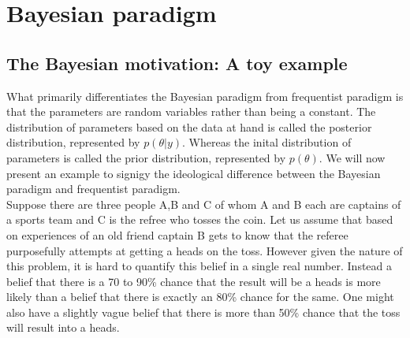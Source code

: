 
\chapter{Bayesian paradigm}
\label{ch : bayesian_paradigm}

\section{The Bayesian motivation: A toy example}
What primarily differentiates the Bayesian paradigm from frequentist paradigm is that the parameters are random variables rather than being a constant. The distribution of parameters based on the data at hand is called the posterior distribution, represented by $p(\theta|y)$. Whereas the inital distribution of parameters is called the prior distribution, represented by $p(\theta)$. We will now present an example to signigy the ideological difference between the Bayesian paradigm and frequentist paradigm.\\

Suppose there are three people A,B and C of whom A and B each are captains of a sports team and C is the refree who tosses the coin. Let us assume that based on experiences of an old friend captain B gets to know that the referee purposefully attempts at getting a heads on the toss. However given the nature of this problem, it is hard to quantify this belief in a single real number. Instead a belief that there is a 70 to 90\% chance that the result will be a heads is more likely than a belief that there is exactly an 80\% chance for the same. One might also have a slightly vague belief that there is more than 50\% chance that the toss will result into a heads.\\

